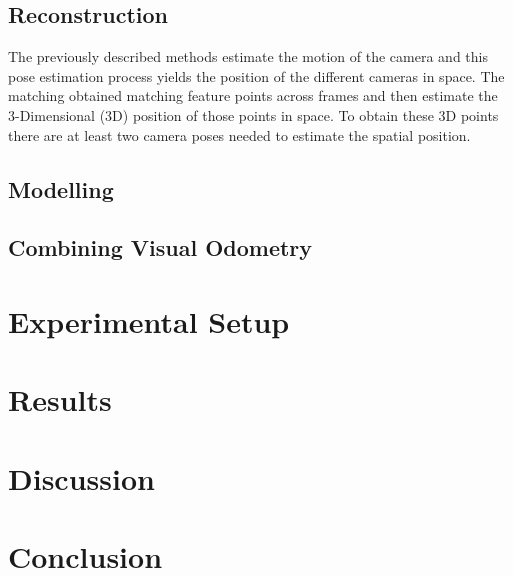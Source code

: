 \documentclass[a4paper]{article}
\begin{document}

\subsection{Reconstruction}
The previously described methods estimate the motion of the camera and this
pose estimation process yields the position of the different cameras in space.
The matching obtained matching feature points across frames and then estimate
the 3-Dimensional (3D) position of those points in space. To obtain these 3D
points there are at least two camera poses needed to estimate the spatial
position.

\subsection{Modelling}


\subsection{Combining Visual Odometry}


\section{Experimental Setup}

\section{Results}

\section{Discussion}

\section{Conclusion}



\end{document}
